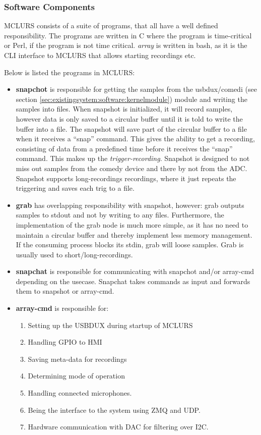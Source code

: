\subsubsection{Software Components} \label{sec:existingsystem:software}
MCLURS consists of a suite of programs, that all have a well defined responsibility. The programs are written in C where the program is time-critical or Perl, if the program is not time critical. \textit{array} is written in bash, as it is the CLI interface to MCLURS that allows starting recordings etc.

Below is listed the programs in MCLURS:
\begin{itemize}
	\item \textbf{snapchot} is responsible for getting the samples from the usbdux/comedi (see section \ref{sec:existingsystem:software:kernelmodule}) module and writing the samples into files. When snapshot is initialized, it will record samples, however data is only saved to a circular buffer until it is told to write the buffer into a file. The snapshot will save part of the circular buffer to a file when it receives a “snap” command. This gives the ability to get a recording, consisting of data from a predefined time before it receives the “snap” command. This makes up the \textit{trigger-recording}. Snapshot is designed to not miss out samples from the comedy device and there by not from the ADC. Snapshot supports long-recordings recordings, where it just repeats the triggering and saves each trig to a file.
	
	\item \textbf{grab} has overlapping responsibility with snapshot, however: grab outputs samples to stdout and not by writing to any files. Furthermore, the implementation of the grab node is much more simple, as it has no need to maintain a circular buffer and thereby implement less memory management. If the consuming process blocks its stdin, grab will loose samples. Grab is usually used to short/long-recordings.

	\item \textbf{snapchat} is responsible for communicating with snapchot and/or array-cmd depending on the usecase. Snapchat takes commands as input and forwards them to snapshot or array-cmd.

	\item \textbf{array-cmd} is responsible for:
	\begin{enumerate}	
		\item Setting up the USBDUX during startup of MCLURS 
		\item Handling GPIO to HMI
		\item Saving meta-data for recordings
		\item Determining mode of operation
		\item Handling connected microphones.
		\item Being the interface to the system using ZMQ and UDP.
		\item Hardware communication with DAC for filtering over I2C.
	\end{enumerate} 


\end{itemize}
